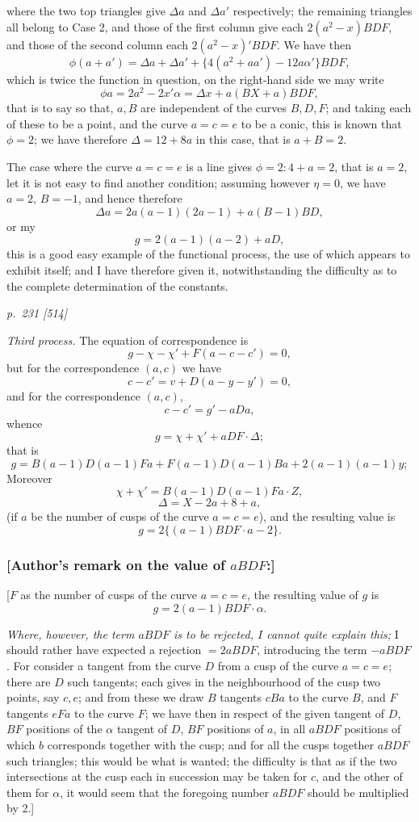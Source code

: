 \documentclass[11pt,a4paper]{article}
\theoremstyle{plain}
\theoremstyle{definition}
\begin{document}
where the two top triangles give $\Delta a$ and $\Delta a'$ respectively; the remaining triangles all
belong to Case 2, and those of the first column give each $2(a^2-x)BDF$, and those
of the second column each $2(a^2-x)'BDF$.  We have then
\[
\phi(a+a')=\Delta a+\Delta a'+\{4(a^2+aa')-12a\alpha'\}BDF,
\]
which is twice the function in question, on the right-hand side we may write
\[
\phi a=2a^2-2x'\alpha=\Delta x+a(BX+a)BDF,
\]
that is to say so that, $a, B$ are independent of the curves $B, D, F$; and taking
each of these to be a point, and the curve $a=c=e$ to be a conic, this is known
that $\phi=2$; we have therefore $\Delta=12+8a$ in this case, that is $a+B=2$.

The case where the curve $a=c=e$ is a line gives $\phi=2:4+a=2$, that is $a=2$,
let it is not easy to find another condition; assuming however $\eta=0$, we have $a=2$,
$B=-1$, and hence therefore
\[
\Delta a=2a(a-1)(2a-1)+a(B-1)BD,
\]
or my
\[
g=2(a-1)(a-2)+aD,
\]
this is a good easy example of the functional process, the use of which appears to
exhibit itself; and I have therefore given it, notwithstanding the difficulty as to the
complete determination of the constants.

\clearpage

\bigskip
\textit{p.~231 [514]}
\smallskip

\textit{Third process.}  The equation of correspondence is
\[
g-\chi-\chi'+F(a-c-c')=0,
\]
but for the correspondence $(a, c)$ we have
\[
c-c'=v+D(a-y-y')=0,
\]
and for the correspondence $(a, c)$,
\[
c-c'=g'-aDa,
\]
whence
\[
g=\chi+\chi'+aDF\cdot \Delta;
\]
that is
\[
g=B(a-1)D(a-1)Fa+F(a-1)D(a-1)Ba+2(a-1)(a-1)y;
\]
Moreover
\[
\chi+\chi'=B(a-1)D(a-1)Fa\cdot Z,
\]
\[
\Delta=X-2a+8+a,
\]
(if $a$ be the number of cusps of the curve $a=c=e$), and the resulting value is
\[
g=2\{(a-1)BDF\cdot a-2\}.
\]

\subsubsection*{[Author's remark on the value of $aBDF$:]}

[$F$ as the number of cusps of the curve $a=c=e$, the resulting value of $g$ is
\[
g=2(a-1)BDF\cdot \alpha.
\]

\textit{Where, however, the term $aBDF$ is to be rejected, $I$ cannot quite explain this;}
I should rather have expected a rejection $=2aBDF$, introducing the term $-aBDF$.
For consider a tangent from the curve $D$ from a cusp of the curve $a=c=e$; there are
$D$ such tangents; each gives in the neighbourhood of the cusp two points, say $c, e$;
and from these we draw $B$ tangents $cBa$ to the curve $B$, and $F$ tangents $eFa$ to the
curve $F$; we have then in respect of the given tangent of $D$, $BF$ positions of the
$\alpha$ tangent of $D$, $BF$ positions of $a$, in all $aBDF$ positions of which $b$ corresponds together with the cusp; and
for all the cusps together $aBDF$ such triangles; this would be what is wanted; the
difficulty is that as if the two intersections at the cusp each in succession may be
taken for $c$, and the other of them for $\alpha$, it would seem that the foregoing number
$aBDF$ should be multiplied by 2.]
\end{document}
